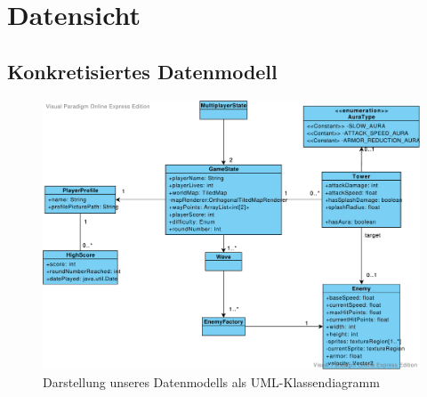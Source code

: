 \documentclass[enabledeprecatedfontcommands,fontsize=12pt,paper=a4,twoside,parskip=half]{scrartcl}
\begin{document}


\clearpage

\section{Datensicht}
\label{sec:datensicht}



\subsection{Konkretisiertes Datenmodell}
\label{subsec:datenmodell}


\begin{figure}[H]
    \centering
    \includegraphics[width=\textwidth]{Bilder/Datenmodell.pdf}
    \caption{Darstellung unseres Datenmodells als UML-Klassendiagramm}
    \label{fig:Datensicht}
\end{figure}
\end{document}
